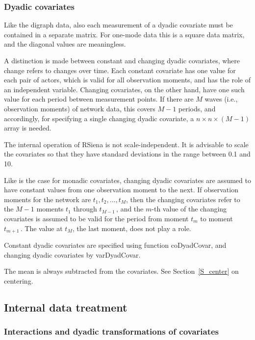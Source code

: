 \documentclass[a4paper,fleqn,11pt]{article}
\newcommand{\+}{\, + \,}
\newcommand{\sfn}[1]{\textsf{#1}}
\newcommand{\RS}{{\sf RSiena }}
\begin{document}
\subsubsection{Dyadic covariates}

Like the digraph data, also each measurement of a dyadic covariate
must be contained in a separate matrix.
For one-mode data this is a square data matrix,
and the diagonal values are meaningless.

A distinction is made between constant and changing dyadic
covariates, where change refers to changes over time. Each constant
covariate has one value for each pair of actors, which is valid for
all observation moments, and has the role of an independent
variable. Changing covariates, on the other hand, have one such
value for each period between measurement points. If there are $M$
waves (i.e., observation moments) of network data,
this covers $M-1$ periods, and accordingly,
for specifying a single changing dyadic covariate,
a $n \times n \times (M-1)$ array is needed.

The internal operation of \RS is not scale-independent.
It is advisable to scale the covariates so that they have
standard deviations in the range between 0.1 and 10.

Like is the case for monadic  covariates,
changing dyadic covariates are assumed to have constant values from one
observation moment to the next. If observation moments for the
network are $t_1, t_2, ..., t_M$, then the changing covariates
refer to the $M-1$ moments $t_1$ through $t_{M-1}\,$, and
the $m$-th value of the changing covariates is assumed to be valid
for the period from moment $t_m$ to moment $t_{m+1}\,$.
The value at $t_M$, the last moment, does not play a role.

Constant dyadic covariates are specified using function
\sfn{coDyadCovar}, and changing dyadic covariates by \sfn{varDyadCovar}.

The mean is always subtracted from the covariates.
See Section~\ref{S_center} on centering.

\subsection{Internal data treatment}
\label{S_internal}

\subsubsection{Interactions and dyadic transformations of covariates}
\end{document}
